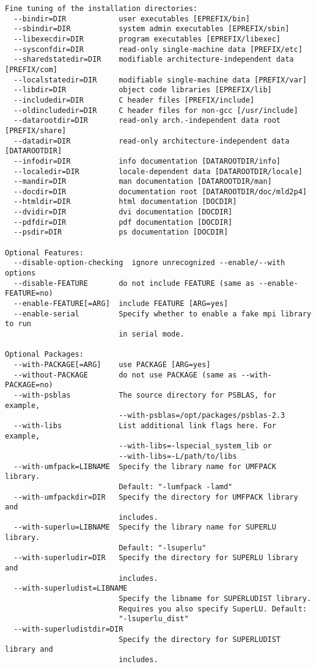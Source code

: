 \begin{verbatim}
Fine tuning of the installation directories:
  --bindir=DIR            user executables [EPREFIX/bin]
  --sbindir=DIR           system admin executables [EPREFIX/sbin]
  --libexecdir=DIR        program executables [EPREFIX/libexec]
  --sysconfdir=DIR        read-only single-machine data [PREFIX/etc]
  --sharedstatedir=DIR    modifiable architecture-independent data [PREFIX/com]
  --localstatedir=DIR     modifiable single-machine data [PREFIX/var]
  --libdir=DIR            object code libraries [EPREFIX/lib]
  --includedir=DIR        C header files [PREFIX/include]
  --oldincludedir=DIR     C header files for non-gcc [/usr/include]
  --datarootdir=DIR       read-only arch.-independent data root [PREFIX/share]
  --datadir=DIR           read-only architecture-independent data [DATAROOTDIR]
  --infodir=DIR           info documentation [DATAROOTDIR/info]
  --localedir=DIR         locale-dependent data [DATAROOTDIR/locale]
  --mandir=DIR            man documentation [DATAROOTDIR/man]
  --docdir=DIR            documentation root [DATAROOTDIR/doc/mld2p4]
  --htmldir=DIR           html documentation [DOCDIR]
  --dvidir=DIR            dvi documentation [DOCDIR]
  --pdfdir=DIR            pdf documentation [DOCDIR]
  --psdir=DIR             ps documentation [DOCDIR]

Optional Features:
  --disable-option-checking  ignore unrecognized --enable/--with options
  --disable-FEATURE       do not include FEATURE (same as --enable-FEATURE=no)
  --enable-FEATURE[=ARG]  include FEATURE [ARG=yes]
  --enable-serial         Specify whether to enable a fake mpi library to run
                          in serial mode.

Optional Packages:
  --with-PACKAGE[=ARG]    use PACKAGE [ARG=yes]
  --without-PACKAGE       do not use PACKAGE (same as --with-PACKAGE=no)
  --with-psblas           The source directory for PSBLAS, for example,
                          --with-psblas=/opt/packages/psblas-2.3
  --with-libs             List additional link flags here. For example,
                          --with-libs=-lspecial_system_lib or
                          --with-libs=-L/path/to/libs
  --with-umfpack=LIBNAME  Specify the library name for UMFPACK library.
                          Default: "-lumfpack -lamd"
  --with-umfpackdir=DIR   Specify the directory for UMFPACK library and
                          includes.
  --with-superlu=LIBNAME  Specify the library name for SUPERLU library.
                          Default: "-lsuperlu"
  --with-superludir=DIR   Specify the directory for SUPERLU library and
                          includes.
  --with-superludist=LIBNAME
                          Specify the libname for SUPERLUDIST library.
                          Requires you also specify SuperLU. Default:
                          "-lsuperlu_dist"
  --with-superludistdir=DIR
                          Specify the directory for SUPERLUDIST library and
                          includes.


\end{verbatim}
